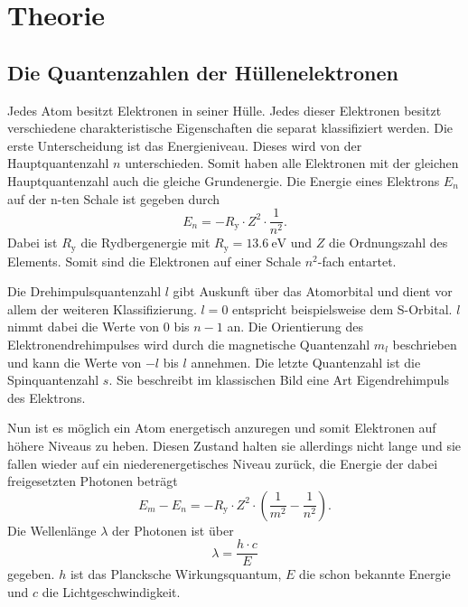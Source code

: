 \section{Theorie}
\label{sec:Theorie}

\subsection{Die Quantenzahlen der Hüllenelektronen}
\label{ssec:theo1}

Jedes Atom besitzt Elektronen in seiner Hülle. Jedes dieser Elektronen besitzt verschiedene charakteristische Eigenschaften die separat klassifiziert werden. 
Die erste Unterscheidung ist das Energieniveau. Dieses wird von der Hauptquantenzahl $n$ unterschieden.
Somit haben alle Elektronen mit der gleichen Hauptquantenzahl auch die gleiche Grundenergie.
Die Energie eines Elektrons $E_n$ auf der n-ten Schale ist gegeben durch
\begin{equation}
    E_n = - R_\text{y} \cdot Z^2 \cdot \frac{1}{n^2}.
    \label{eq:n}
\end{equation}
Dabei ist $R_\text{y}$ die Rydbergenergie mit $ R_\text{y} = \SI{13.6}{\electronvolt}$ und $Z$ die Ordnungszahl des Elements.
Somit sind die Elektronen auf einer Schale $n^2$-fach entartet.

Die Drehimpulsquantenzahl $l$ gibt Auskunft über das Atomorbital und dient vor allem der weiteren Klassifizierung.
$l = 0$ entspricht beispielsweise dem S-Orbital.
$l$ nimmt dabei die Werte von $0$ bis $ n - 1 $ an. 
Die Orientierung des Elektronendrehimpulses wird durch die magnetische Quantenzahl $m_l$ beschrieben und kann die Werte von $- l $ bis $ l $ annehmen.
Die letzte Quantenzahl ist die Spinquantenzahl $s$. 
Sie beschreibt im klassischen Bild eine Art Eigendrehimpuls des Elektrons.

Nun ist es möglich ein Atom energetisch anzuregen und somit Elektronen auf höhere Niveaus zu heben.
Diesen Zustand halten sie allerdings nicht lange und sie fallen wieder auf ein niederenergetisches Niveau zurück, die Energie der dabei freigesetzten Photonen beträgt 
\begin{equation}
    E_m - E_n = - R_\text{y} \cdot Z^2 \cdot \left( \frac{1}{m^2} - \frac{1}{n^2} \right).
    \label{eq:energiediff}
\end{equation}
Die Wellenlänge $\lambda$ der Photonen ist über
\begin{equation}
     \lambda = \frac{h \cdot c}{E}
    \label{eq:wellenl}
\end{equation}
gegeben. $h$ ist das Plancksche Wirkungsquantum, $E$ die schon bekannte Energie und $c$ die Lichtgeschwindigkeit.


